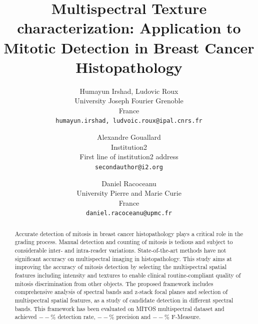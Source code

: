 \documentclass[10pt,twocolumn,letterpaper]{article}
\begin{document}
\title{Multispectral Texture characterization: Application to Mitotic Detection in Breast Cancer Histopathology}

\author{Humayun Irshad, Ludovic Roux\\
	University Joseph Fourier Grenoble \\ France\\
	{\tt\small {humayun.irshad, ludvoic.roux}@ipal.cnrs.fr} \\
	\and 
	Alexandre Gouallard\\
	Institution2\\ First line of institution2 address\\
	{\tt\small secondauthor@i2.org} \\
	\and
	Daniel Racoceanu\\
	University Pierre and Marie Curie \\ France\\
	{\tt\small daniel.racoceanu@upmc.fr}
}

\maketitle

\begin{abstract}
Accurate detection of mitosis in breast cancer histopathology plays a critical role in the grading process. Manual detection and counting of mitosis is tedious and subject to considerable inter- and intra-reader variations. State-of-the-art methods have not significant accuracy on multispectral imaging in histopathology. This study aims at improving the accuracy of mitosis detection by selecting the multispectral spatial features including intensity and textures to enable clinical routine-compliant quality of mitosis discrimination from other objects. The proposed framework includes comprehensive analysis of spectral bands and z-stack focal planes and selection of multispectral spatial features, as a study of candidate detection in different spectral bands. This framework has been evaluated on MITOS multispectral dataset and achieved $--\%$ detection rate, $--\%$ precision and $--\%$ F-Measure. 
\end{abstract}
\end{document}
